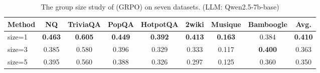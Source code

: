 
\begin{table}[h]
    \centering
    \scriptsize
    \setlength{\tabcolsep}{3pt}
    \renewcommand{\arraystretch}{1.2}
    \caption{The group size study of \Ours (GRPO) on seven datasets. (LLM: Qwen2.5-7b-base)}\label{tab:apx:grpo-size}
    \begin{tabular}{lcccccccc}
        \toprule
        \textbf{Method} & \textbf{NQ} & \textbf{TriviaQA} & \textbf{PopQA} & \textbf{HotpotQA} & \textbf{2wiki} & \textbf{Musique} & \textbf{Bamboogle} & \textbf{Avg.} \\
        \midrule
        size=1 & \textbf{0.463} & \textbf{0.605} & \textbf{0.449} & \textbf{0.392} & \textbf{0.413} & \textbf{0.163} & 0.384 & \textbf{0.410} \\
        size=3 & 0.385 & 0.580 & 0.396 & 0.329 & 0.333 & 0.117 & \textbf{0.400} & 0.363 \\
        size=5 & 0.395 & 0.560 & 0.388 & 0.326 & 0.297 & 0.125 & 0.360 & 0.350 \\
        \bottomrule
    \end{tabular}
\end{table}
